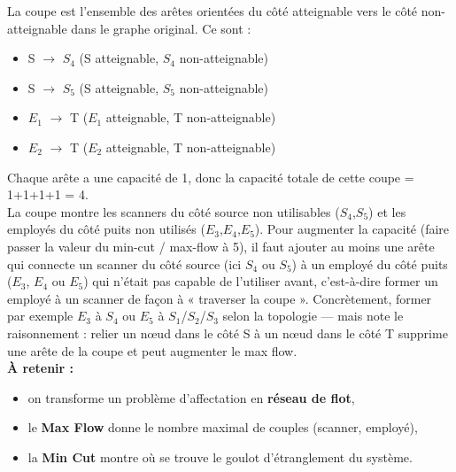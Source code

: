 La coupe est l’ensemble des arêtes orientées du côté atteignable vers le côté non-atteignable dans le graphe original. Ce sont :
\begin{itemize}
    \item S $\rightarrow$ $S_4$ (S atteignable, $S_4$ non-atteignable)
    \item S $\rightarrow$ $S_5$ (S atteignable, $S_5$ non-atteignable)
    \item $E_1$ $\rightarrow$ T ($E_1$ atteignable, T non-atteignable)
    \item $E_2$ $\rightarrow$ T ($E_2$ atteignable, T non-atteignable) \\
\end{itemize}

Chaque arête a une capacité de 1, donc la capacité totale de cette coupe = 1+1+1+1 = 4. \\

La coupe montre les scanners du côté source non utilisables ($S_4$,$S_5$) et les employés du côté puits non utilisés ($E_3$,$E_4$,$E_5$). Pour augmenter la capacité (faire passer la valeur du min-cut / max-flow à 5), il faut ajouter au moins une arête qui connecte un scanner du côté source (ici $S_4$ ou $S_5$) à un employé du côté puits ($E_3$, $E_4$ ou $E_5$) qui n’était pas capable de l’utiliser avant, c'est-à-dire former un employé à un scanner de façon à « traverser la coupe ». Concrètement, former par exemple $E_3$ à $S_4$ ou $E_5$ à $S_1$/$S_2$/$S_3$ selon la topologie — mais note le raisonnement : relier un nœud dans le côté S à un nœud dans le côté T supprime une arête de la coupe et peut augmenter le max flow. \\

\textbf{À retenir :}
\begin{itemize}
    \item on transforme un problème d’affectation en \textbf{réseau de flot},
    \item le \textbf{Max Flow} donne le nombre maximal de couples (scanner, employé),
    \item la \textbf{Min Cut} montre où se trouve le \og goulot d’étranglement\fg{} du système.
\end{itemize}






